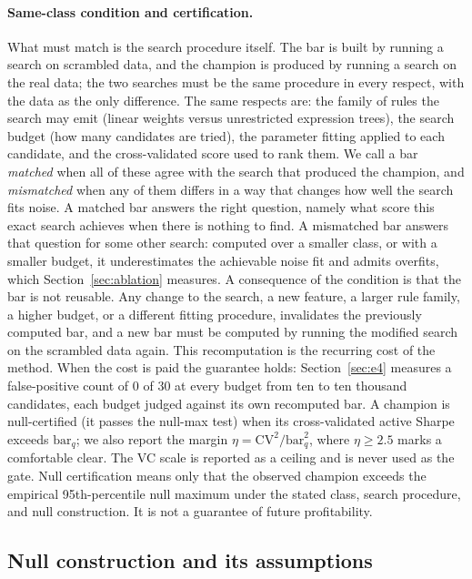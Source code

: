 \documentclass[11pt]{article}
\begin{document}
\paragraph{Same-class condition and certification.} What must match is the search procedure itself.
The bar is built by running a search on scrambled data, and the champion is produced by running a
search on the real data; the two searches must be the same procedure in every respect, with the data as
the only difference. The same respects are: the family of rules the search may emit (linear weights
versus unrestricted expression trees), the search budget (how many candidates are tried), the parameter
fitting applied to each candidate, and the cross-validated score used to rank them. We call a bar
\emph{matched} when all of these agree with the search that produced the champion, and \emph{mismatched}
when any of them differs in a way that changes how well the search fits noise. A matched bar answers the
right question, namely what score this exact search achieves when there is nothing to find. A mismatched
bar answers that question for some other search: computed over a smaller class, or with a smaller
budget, it underestimates the achievable noise fit and admits overfits, which
Section~\ref{sec:ablation} measures. A consequence of the condition is that the bar is not reusable.
Any change to the search, a new feature, a larger rule family, a higher budget, or a different fitting
procedure, invalidates the previously computed bar, and a new bar must be computed by running the
modified search on the scrambled data again. This recomputation is the recurring cost of the method.
When the cost is paid the guarantee holds: Section~\ref{sec:e4} measures a false-positive count of 0 of
30 at every budget from ten to ten thousand candidates, each budget judged against its own recomputed
bar. A champion
is null-certified (it passes the null-max test) when its cross-validated active Sharpe exceeds
$\mathrm{bar}_q$; we also report the margin $\eta=\mathrm{CV}^{2}/\mathrm{bar}_q^{2}$, where
$\eta\ge 2.5$ marks a comfortable clear. The VC scale is reported as a ceiling and is never used as the
gate. Null certification means only that the observed champion exceeds the empirical 95th-percentile
null maximum under the stated class, search procedure, and null construction. It is not a guarantee of
future profitability.

\subsection{Null construction and its assumptions}
\label{sec:nullassume}
\end{document}
